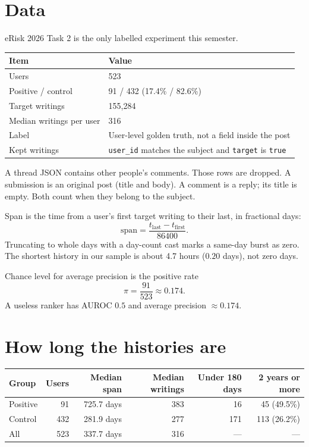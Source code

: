 \documentclass[11pt,a4paper]{article}
\begin{document}
\section{Data}
eRisk 2026 Task 2 is the only labelled experiment this semester.

\begin{center}
\begin{tabular}{ll}
\toprule
\textbf{Item} & \textbf{Value} \\
\midrule
Users & 523 \\
Positive / control & 91 / 432 (17.4\% / 82.6\%) \\
Target writings & 155,284 \\
Median writings per user & 316 \\
Label & User-level golden truth, not a field inside the post \\
Kept writings & \texttt{user\_id} matches the subject and \texttt{target} is \texttt{true} \\
\bottomrule
\end{tabular}
\end{center}

A thread JSON contains other people's comments. Those rows are dropped. A submission is an original post (title and body). A comment is a reply; its title is empty. Both count when they belong to the subject.

Span is the time from a user's first target writing to their last, in fractional days:
\begin{equation}
\mathrm{span} = \frac{t_{\mathrm{last}} - t_{\mathrm{first}}}{86400}.
\end{equation}
Truncating to whole days with a day-count cast marks a same-day burst as zero. The shortest history in our sample is about 4.7 hours ($0.20$ days), not zero days.

Chance level for average precision is the positive rate
\begin{equation}
\pi = \frac{91}{523} \approx 0.174.
\end{equation}
A useless ranker has AUROC $0.5$ and average precision $\approx 0.174$.

\section{How long the histories are}

\begin{center}
\begin{tabular}{lrrrrr}
\toprule
\textbf{Group} & \textbf{Users} & \textbf{Median span} & \textbf{Median writings} & \textbf{Under 180 days} & \textbf{2 years or more} \\
\midrule
Positive & 91 & 725.7 days & 383 & 16 & 45 (49.5\%) \\
Control & 432 & 281.9 days & 277 & 171 & 113 (26.2\%) \\
All & 523 & 337.7 days & 316 & --- & --- \\
\bottomrule
\end{tabular}
\end{center}
\end{document}
